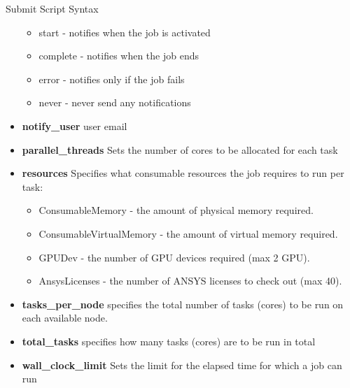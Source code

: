 \documentclass[final,t]{beamer}
\begin{document}
\begin{frame}[fragile]{}
\begin{columns}[t]
\begin{column}{.3\linewidth}
\begin{block}{Submit Script Syntax}
\begin{itemize}
\begin{itemize}
            \item start - notifies when the job is activated
            \item complete - notifies when the job ends
            \item error - notifies only if the job fails
            \item never - never send any notifications
        \end{itemize}
        \item \textbf{notify\_user} user email
        \item \textbf{parallel\_threads} Sets the number of cores to be allocated for each task
        \item \textbf{resources} Specifies what consumable resources the job requires to run per task:
        \begin{itemize}
            \item ConsumableMemory - the amount of physical memory required. 
            \item ConsumableVirtualMemory - the amount of virtual memory required.
            \item GPUDev - the number of GPU devices required (max 2 GPU).
            \item AnsysLicenses - the number of ANSYS licenses to check out (max 40).
        \end{itemize}
        \item \textbf{tasks\_per\_node} specifies the total number of tasks (cores) to be run on each available node.
        \item \textbf{total\_tasks} specifies how many tasks (cores) are to be run in total
        \item \textbf{wall\_clock\_limit} Sets the limit for the elapsed time for which a job can run
        \end{itemize}
      \end{block}



\end{column}
\end{columns}
\end{frame}
\end{document}
